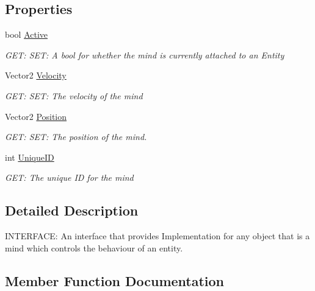 \subsection*{Properties}
\begin{DoxyCompactItemize}
\item 
bool \hyperlink{a00446_a50008fc232397651429a06699310ef6f}{Active}
\begin{DoxyCompactList}\small\item\em G\+ET\+: S\+ET\+: A bool for whether the mind is currently attached to an Entity \end{DoxyCompactList}\item 
Vector2 \hyperlink{a00446_a662544c982afdebf739a9a0eaa9b7a80}{Velocity}
\begin{DoxyCompactList}\small\item\em G\+ET\+: S\+ET\+: The velocity of the mind \end{DoxyCompactList}\item 
Vector2 \hyperlink{a00446_ad1af5071b566a62b9e64aad821da9f21}{Position}
\begin{DoxyCompactList}\small\item\em G\+ET\+: S\+ET\+: The position of the mind. \end{DoxyCompactList}\item 
int \hyperlink{a00446_a33ec6f3f0e9f14bdcab38fd0f28148d1}{Unique\+ID}
\begin{DoxyCompactList}\small\item\em G\+ET\+: The unique ID for the mind \end{DoxyCompactList}\end{DoxyCompactItemize}


\subsection{Detailed Description}
I\+N\+T\+E\+R\+F\+A\+CE\+: An interface that provides Implementation for any object that is a mind which controls the behaviour of an entity. 



\subsection{Member Function Documentation}
\mbox{\label{a00446_a3cbff0e85b710a4c8737254ed9ca7b30}} 
